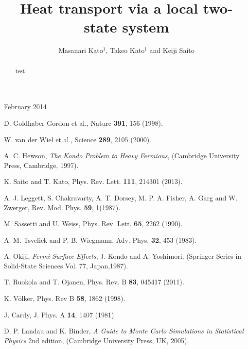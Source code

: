 \documentclass[12pt]{iopart}
\begin{document}
\title{Heat transport via a local two-state system}
\author{Masanari Kato$^1$, Takeo Kato$^1$ and Keiji Saito}
\address{$^1$ IOP Publishing, Temple Circus, Temple Way, Bristol BS1 6HG, UK}
\vspace{10pt}
\begin{indented}
\item[]February 2014
\end{indented}

\begin{abstract}
test
\end{abstract}








\begin{thebibliography}{99}

D. Goldhaber-Gordon et al., Nature {\bf 391}, 156 (1998).

W. van der Wiel et al., Science {\bf 289}, 2105 (2000).

A. C. Hewson, {\em The Kondo Problem to Heavy Fermions}, 
(Cambridge University Press, Cambridge, 1997).

 K. Saito and T. Kato, Phys. Rev. Lett. \textbf{111}, 214301 (2013).

A. J. Leggett, S. Chakravarty, A. T. Dorsey, M. P. A. Fisher, A. Garg and W. Zwerger, Rev. Mod. Phys. {\bf 59}, 1(1987).

 M. Sassetti and U. Weiss, Phys. Rev. Lett. \textbf{65}, 2262 (1990).

 A. M. Tsvelick and P. B. Wiegmann, Adv. Phys. \textbf{32}, 453 (1983).

 A. Okiji, {\it Fermi Surface Effects}, J. Kondo and A. Yoshimori, (Springer Series in Solid-State Sciences Vol. 77, Japan,1987).

 T. Ruokola and T. Ojanen, Phys. Rev. B \textbf{83}, 045417 (2011).

K. V\"olker, Phys. Rev B {\bf 58}, 1862 (1998).

 J. Cardy, J. Phys. A \textbf{14}, 1407 (1981).

 D. P. Landau and K. Binder, {\it A Guide to Monte Carlo Simulations in Statistical Physics} 2nd edition, (Cambridge University Press, UK, 2005).


\end{thebibliography}
\end{document}
